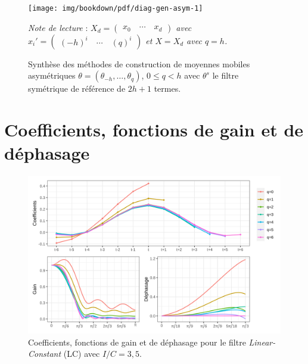 \documentclass[
  12pt,
  french,
  12pt,a4paper]{article}
\newcommand\1{\mathds{1}}
\begin{document}
\begin{figure}[!ht]

{\centering \texttt{[image: img/bookdown/pdf/diag-gen-asym-1]} 

}

\caption[Synthèse des méthodes de construction de moyennes mobiles asymétriques \(\theta=(\theta_{-h},\dots,\theta_{q})\), \(0\leq q< h\) avec \(\theta^s\) le filtre symétrique de référence de \(2h+1\) termes]{Synthèse des méthodes de construction de moyennes mobiles asymétriques \(\theta=(\theta_{-h},\dots,\theta_{q})\), \(0\leq q< h\) avec \(\theta^s\) le filtre symétrique de référence de \(2h+1\) termes.}\label{fig:diag-gen-asym}

\footnotesize


\emph{Note de lecture} : \emph{\(X_d = \begin{pmatrix} x_0 \quad\cdots \quad x_d \end{pmatrix}\) avec \(x_i'=\begin{pmatrix} (-h)^i \quad \cdots \quad (q)^i\end{pmatrix}\) et \(X=X_d\) avec \(q=h\).}
\normalsize\end{figure}

\newpage

\hypertarget{an-graphs}{%
\section{Coefficients, fonctions de gain et de déphasage}\label{an-graphs}}

\begin{figure}[H]

{\centering \includegraphics[width=1\linewidth]{img/filters_used/lc} 

}

\caption[Coefficients, fonctions de gain et de déphasage pour le filtre \emph{Linear-Constant} (LC) avec \(I/C=3,5\)]{Coefficients, fonctions de gain et de déphasage pour le filtre \emph{Linear-Constant} (LC) avec \(I/C=3,5\).}\label{fig:graphslc}

\footnotesize
\normalsize\end{figure}
\end{document}
